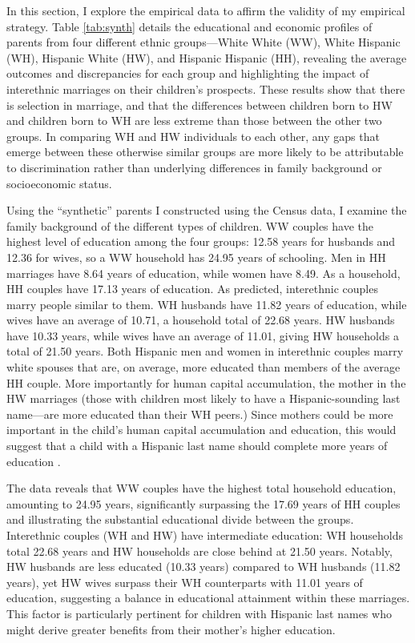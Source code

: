 In this section, I explore the empirical data to affirm the validity of my empirical strategy. Table \ref{tab:synth} details the educational and economic profiles of parents from four different ethnic groups—White White (WW), White Hispanic (WH), Hispanic White (HW), and Hispanic Hispanic (HH), revealing the average outcomes and discrepancies for each group and highlighting the impact of interethnic marriages on their children’s prospects. These results show that there is selection in marriage, and that the differences between children born to HW and children born to WH are less extreme than those between the other two groups. In comparing WH and HW individuals to each other, any gaps that emerge between these otherwise similar groups are more likely to be attributable to discrimination rather than underlying differences in family background or socioeconomic status.

Using the “synthetic” parents I constructed using the Census data, I examine the family background of the different types of children. WW couples have the highest level of education among the four groups: 12.58 years  for husbands and 12.36 for wives, so a WW household has 24.95 years of schooling. Men in HH marriages have 8.64 years of education, while women have 8.49. As a household, HH couples have 17.13 years of education. As predicted, interethnic couples marry people similar to them. WH husbands have 11.82 years of education, while wives have an average of 10.71, a household total of 22.68 years. HW husbands have 10.33 years, while wives have an average of 11.01, giving HW households a total of 21.50 years. Both  Hispanic men and women in interethnic couples marry white spouses that are, on average, more educated than members of the average HH couple. More importantly for human capital accumulation, the mother in the HW marriages (those with children most likely to have a Hispanic-sounding last name—are more educated than their WH peers.) Since mothers could be more important in the child’s human capital accumulation and education, this would suggest that a child with a Hispanic last name should complete more years of education  \autocite{gould2020does}.

The data reveals that WW couples have the highest total household education, amounting to 24.95 years, significantly surpassing the 17.69 years of HH couples and illustrating the substantial educational divide between the groups. Interethnic couples (WH and HW) have intermediate education: WH households total 22.68 years and HW households are close behind at 21.50 years. Notably, HW husbands are less educated (10.33 years) compared to WH husbands (11.82 years), yet HW wives surpass their WH counterparts with 11.01 years of education, suggesting a balance in educational attainment within these marriages. This factor is particularly pertinent for children with Hispanic last names who might derive greater benefits from their mother’s higher education.


